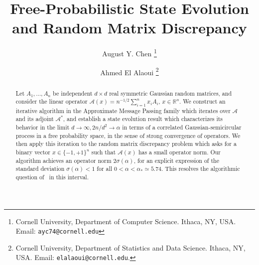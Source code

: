 \documentclass[11pt]{article}
\title{Free-Probabilistic State Evolution and Random Matrix Discrepancy}
\author{
August Y. Chen \thanks{Cornell University, Department of Computer Science. Ithaca, NY, USA. Email: \texttt{ayc74@cornell.edu}}
\and
Ahmed El Alaoui \thanks{Cornell University, Department of Statistics and Data Science. Ithaca, NY, USA. Email: \texttt{elalaoui@cornell.edu}.}
}
\date{}
\theoremstyle{definition}
\theoremstyle{remark}
\numberwithin{equation}{section}
\numberwithin{theorem}{section}
\newcommand{\R}{\mathbb R}
\newcommand{\cA}{\mathcal A}
\begin{document}
\maketitle


\begin{abstract}
Let $A_1,\ldots,A_n$ be independent $d \times d$ real symmetric Gaussian random matrices, and consider the linear operator $\cA(x) = n^{-1/2}\sum_{i=1}^n x_iA_i$, $x\in \R^n$. We construct an iterative algorithm in the Approximate Message Passing family which iterates over $\cA$ and its adjoint $\cA^*$, and establish a state evolution result which  characterizes its behavior in the limit $d\to \infty, 2n/d^2 \to \alpha$ in terms of a correlated Gaussian-semicircular process in a free probability space, in the sense of strong convergence of operators.  We then apply this iteration to the random matrix discrepancy problem which asks for a binary vector $x \in \{-1,+1\}^n$ such that $\cA(x)$ has a small operator norm. Our algorithm achieves an operator norm $2\sigma(\alpha)$, for an explicit expression of the standard deviation $\sigma(\alpha)<1$ for all $0<\alpha<\alpha_* \simeq 5.74$. This resolves the algorithmic question of~\cite{kunisky2023average,maillard2025average} in this interval.      
\end{abstract}



\tableofcontents
\end{document}

